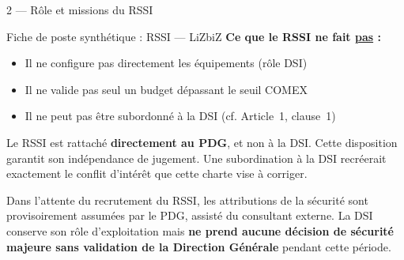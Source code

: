 \documentclass[12pt,a4paper]{article}
\begin{document}
\begin{boxarticle}{2 --- Rôle et missions du RSSI}
\begin{boxrole}{Fiche de poste synthétique : RSSI --- LiZbiZ}
\vspace{0.4em}
\textbf{\color{CharteCritBord}Ce que le RSSI ne fait \underline{pas} :}
\begin{itemize}
    \item Il ne configure pas directement les équipements (rôle DSI)
    \item Il ne valide pas seul un budget dépassant le seuil COMEX
    \item Il ne peut pas être subordonné à la DSI (cf. Article~1,
    clause~1)
\end{itemize}
\end{boxrole}

Le RSSI est rattaché \textbf{directement au PDG}, et non à la DSI.
Cette disposition garantit son indépendance de jugement. Une subordination
à la DSI recréerait exactement le conflit d'intérêt que cette charte
vise à corriger.

Dans l'attente du recrutement du RSSI, les attributions
 de la sécurité sont provisoirement assumées par le
PDG, assisté du consultant externe. La DSI conserve son rôle
d'exploitation mais \textbf{ne prend aucune décision de sécurité majeure
sans validation de la Direction Générale} pendant cette période.

\end{boxarticle}

\vspace{0.4cm}
\end{document}
